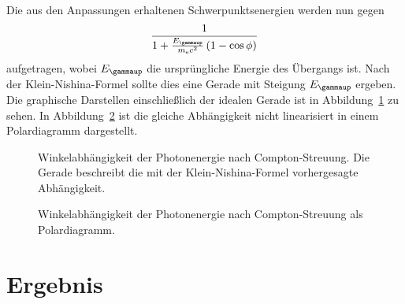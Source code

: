 \documentclass[11pt, ngerman, fleqn, DIV=15, headinclude, BCOR=2cm]{scrreprt}
\begin{document}
\clearpage

Die aus den Anpassungen erhaltenen Schwerpunktsenergien werden nun gegen
\[
    \frac1{1+\frac{E_\gammaup}{m_\text{e}c^2}\del{1-\cos\phi}}
\]
aufgetragen, wobei $E_\gammaup$ die ursprüngliche Energie des Übergangs ist. Nach der
Klein-Nishina-Formel sollte dies eine Gerade mit Steigung $E_\gammaup$ ergeben.
Die graphische Darstellen einschließlich der idealen Gerade ist in
Abbildung~\ref{fig:E_winkelabhaengigkeit} zu sehen. In
Abbildung~\ref{fig:nishina-ex} ist die gleiche Abhängigkeit nicht linearisiert
in einem Polardiagramm dargestellt.

\begin{figure}[htbp]
    \centering
    \caption{%
        Winkelabhängigkeit der Photonenergie nach Compton-Streuung. Die
        Gerade beschreibt die mit der Klein-Nishina-Formel vorhergesagte
        Abhängigkeit.
    }
    \label{fig:E_winkelabhaengigkeit}
\end{figure}

\begin{figure}[htbp]
    \centering
    \caption{%
        Winkelabhängigkeit der Photonenergie nach Compton-Streuung als
        Polardiagramm.
    }
    \label{fig:nishina-ex}
\end{figure}


\chapter{Ergebnis}

\end{document}
